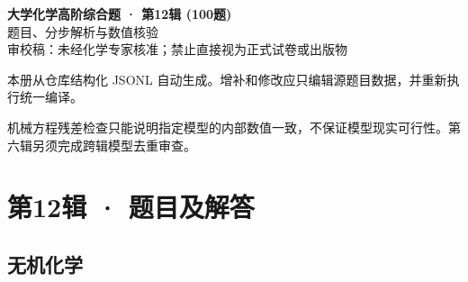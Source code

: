 \documentclass[UTF8,11pt,a4paper]{ctexart}
\begin{document}
\begin{center}
{\LARGE\bfseries 大学化学高阶综合题 · 第12辑 (100题)}\\[0.8em]
{\large 题目、分步解析与数值核验}\\[0.5em]
{\small \textcolor{red!65!black}{审校稿：未经化学专家核准；禁止直接视为正式试卷或出版物}}
\end{center}
\vspace{1em}
\noindent 本册从仓库结构化 JSONL 自动生成。增补和修改应只编辑源题目数据，并重新执行统一编译。
\par 机械方程残差检查只能说明指定模型的内部数值一致，不保证模型现实可行性。第六辑另须完成跨辑模型去重审查。
\tableofcontents
\clearpage
\section*{第12辑 · 题目及解答}
\subsection*{无机化学}
\end{document}
